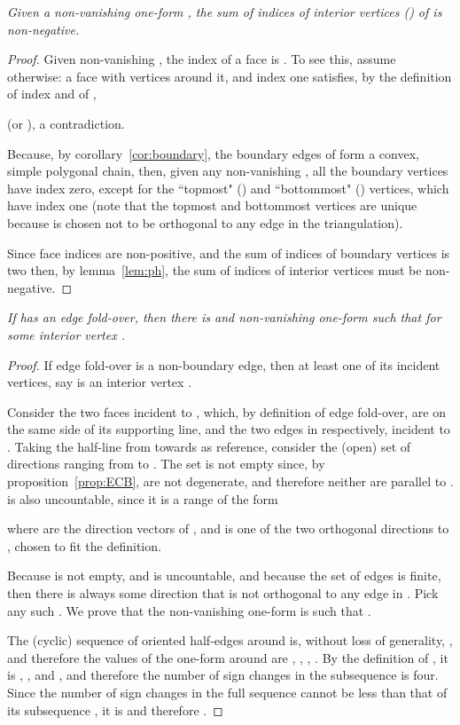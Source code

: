 \documentclass[11pt]{article}
\begin{document}
\emph{
	Given a non-vanishing one-form , the sum of indices of interior vertices () of  is non-negative. 
}
\begin{proof}
Given non-vanishing , 
the index of a face  is . 
To see this, assume otherwise: a face with vertices  around it, and index one satisfies, by the
definition of index and of , 
 
(or ), a
contradiction. 

Because, by corollary~\ref{cor:boundary}, the boundary edges of  form a convex, 
	simple polygonal chain, then, given any non-vanishing , all the boundary vertices have
index zero, except for the ``topmost" () 
and ``bottommost" () vertices, which have
index one (note that the topmost and bottommost vertices are unique because  is chosen not to be orthogonal to any edge in the triangulation). 

Since face indices are non-positive, and the sum of indices of
boundary vertices is two then, by lemma~\ref{lem:ph},
the sum of indices of {interior} vertices must be non-negative. 
\end{proof}






\emph{
If  has an edge fold-over, then there is  and non-vanishing one-form  such
that  for some interior vertex . }
\begin{proof}
If edge fold-over  is a non-boundary edge, then at least one
of its incident vertices, say  is an interior vertex . 

Consider the two faces  incident to , which, by definition of
edge fold-over, are on the same side of its
supporting line, and the two edges  in  respectively,
incident to . 
Taking the half-line  from  towards  as reference, consider 
the (open) set  of directions ranging from  to
. 
The set  is not empty since, by proposition~\ref{prop:ECB},  are not degenerate, and therefore neither  are parallel
to .  is also uncountable, since it is a range of the form

where  are the direction vectors of , and
 is one of the two orthogonal directions to , 
chosen to fit the definition. 

Because  is not empty, and is uncountable, and because the set of edges  is finite,
then there is always some direction  that is not orthogonal to any edge in
. 
Pick any such . 
We prove that the non-vanishing one-form  is such that
. 

The (cyclic) sequence of oriented half-edges {around}  is, without loss of generality,
, and therefore the values of the
one-form around  are , ,
, . 
By the definition of , it is , ,
and , and therefore 
the number of sign changes in 
the subsequence
 is four. 
Since the number of sign changes in the full sequence  cannot
be less
than that of its subsequence , 
it is  and therefore . 
\end{proof}
\end{document}
